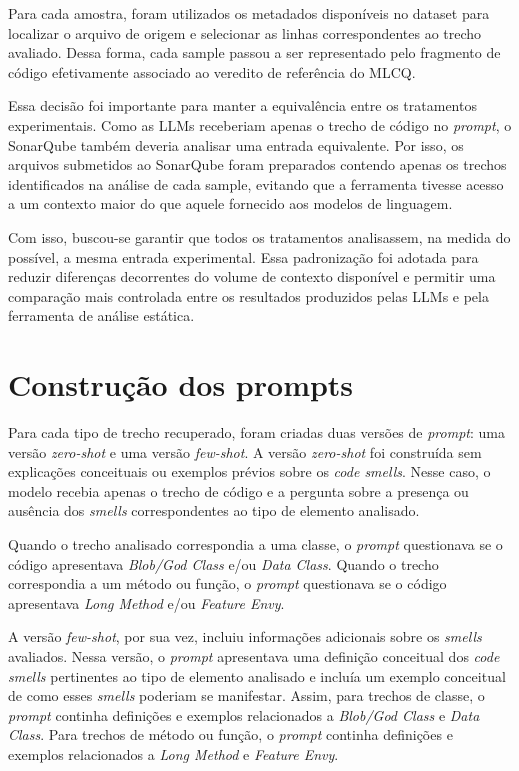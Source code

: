 Para cada amostra, foram utilizados os metadados disponíveis no dataset para localizar o arquivo de origem e selecionar 
as linhas correspondentes ao trecho avaliado. Dessa forma, cada sample passou a ser representado pelo fragmento de código 
efetivamente associado ao veredito de referência do MLCQ.

Essa decisão foi importante para manter a equivalência entre os tratamentos experimentais. Como as LLMs receberiam 
apenas o trecho de código no \textit{prompt}, o SonarQube também deveria analisar uma entrada equivalente. Por isso, os arquivos 
submetidos ao SonarQube foram preparados contendo apenas os trechos identificados na análise de cada sample, evitando que a ferramenta 
tivesse acesso a um contexto maior do que aquele fornecido aos modelos de linguagem.

Com isso, buscou-se garantir que todos os tratamentos analisassem, na medida do possível, a mesma entrada experimental. 
Essa padronização foi adotada para reduzir diferenças decorrentes do volume de contexto disponível e permitir uma comparação mais controlada 
entre os resultados produzidos pelas LLMs e pela ferramenta de análise estática.

\section{Construção dos prompts}

Para cada tipo de trecho recuperado, foram criadas duas versões de \textit{prompt}: uma versão \textit{zero-shot} e uma versão \textit{few-shot}. 
A versão \textit{zero-shot} foi construída sem explicações conceituais ou exemplos prévios sobre os \textit{code smells}. 
Nesse caso, o modelo recebia apenas o trecho de código e a pergunta sobre a presença ou ausência dos \textit{smells} correspondentes ao tipo de elemento analisado.

Quando o trecho analisado correspondia a uma classe, o \textit{prompt} questionava se o código apresentava \textit{Blob/God Class} e/ou \textit{Data Class}. 
Quando o trecho correspondia a um método ou função, o \textit{prompt} questionava se o código apresentava \textit{Long Method} e/ou \textit{Feature Envy}.

A versão \textit{few-shot}, por sua vez, incluiu informações adicionais sobre os \textit{smells} avaliados. 
Nessa versão, o \textit{prompt} apresentava uma definição conceitual dos \textit{code smells} pertinentes ao tipo de elemento analisado e incluía 
um exemplo conceitual de como esses \textit{smells} poderiam se manifestar. Assim, para trechos de classe, o \textit{prompt} continha definições e 
exemplos relacionados a \textit{Blob/God Class} e \textit{Data Class}. Para trechos de método ou função, o \textit{prompt} continha definições e exemplos relacionados a \textit{Long Method} e \textit{Feature Envy}.


